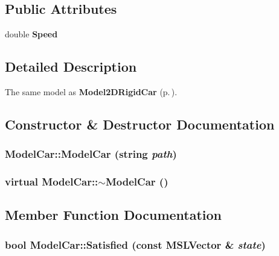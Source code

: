 \subsection*{Public Attributes}
\begin{CompactItemize}
\item 
double {\bf Speed}
\end{CompactItemize}


\subsection{Detailed Description}
The same model as {\bf Model2DRigid\-Car} {\rm (p.\,\pageref{classModel2DRigidCar})}.



\subsection{Constructor \& Destructor Documentation}
\subsubsection{\setlength{\rightskip}{0pt plus 5cm}Model\-Car::Model\-Car (string {\em path})}\label{classModelCar_a0}


\subsubsection{\setlength{\rightskip}{0pt plus 5cm}virtual Model\-Car::$\sim$Model\-Car ()\hspace{0.3cm}{\tt  [inline, virtual]}}\label{classModelCar_a1}




\subsection{Member Function Documentation}
\subsubsection{\setlength{\rightskip}{0pt plus 5cm}bool Model\-Car::Satisfied (const {\bf MSLVector} \& {\em state})\hspace{0.3cm}{\tt  [virtual]}}\label{classModelCar_a3}


